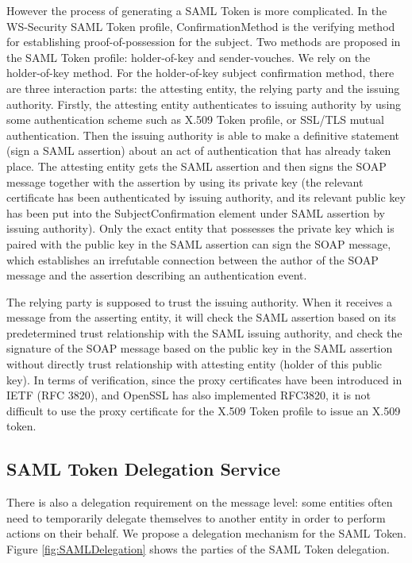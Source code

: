 However the process of generating a SAML Token is more complicated. In the WS-Security SAML Token profile, ConfirmationMethod is the verifying method for establishing proof-of-possession for the subject. Two methods are proposed in the SAML Token profile: holder-of-key and sender-vouches. We rely on the holder-of-key method. For the holder-of-key subject confirmation method, there are three interaction parts: the attesting entity, the relying party and the issuing authority. Firstly, the attesting entity authenticates to issuing authority by using some authentication scheme such as X.509 Token profile, or SSL/TLS mutual authentication. Then the issuing authority is able to make a definitive statement (sign a SAML assertion) about an act of authentication that has already taken place. The attesting entity gets the SAML assertion and then signs the SOAP message together with the assertion by using its private key (the relevant certificate has been authenticated by issuing authority, and its relevant public key has been put into the SubjectConfirmation element under SAML assertion by issuing authority). Only the exact entity that possesses the private key which is paired with the public key in the SAML assertion can sign the SOAP message, which establishes an irrefutable connection between the author of the SOAP message and the assertion describing an authentication event.

The relying party is supposed to trust the issuing authority. When it receives a message from the asserting entity, it will check the SAML assertion based on its predetermined trust relationship with the SAML issuing authority, and check the signature of the SOAP message based on the public key in the SAML assertion without directly trust relationship with attesting entity (holder of this public key).
In terms of verification, since the proxy certificates have been introduced in IETF (RFC 3820)\cite{RFC3820link}, and OpenSSL has also implemented RFC3820, it is not difficult to use the proxy certificate for the X.509 Token profile to issue an X.509 token.


\subsection{SAML Token Delegation Service}
\label{sec:samldeleg}
There is also a delegation requirement on the message level: some entities often need to temporarily delegate themselves to another entity in order to perform actions on their behalf. We propose a delegation mechanism for the SAML Token. Figure \ref{fig:SAMLDelegation} shows the parties of the SAML Token delegation.

